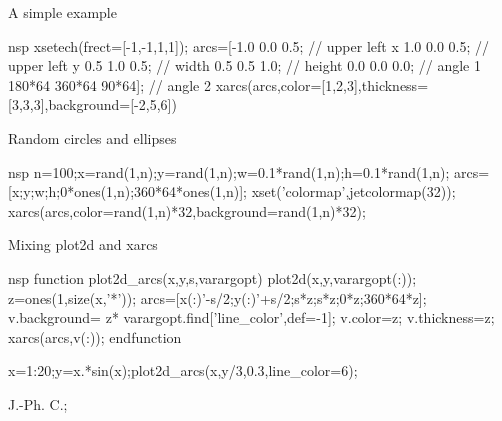 \begin{examples}

\noindent A simple example

\begin{mintednsp}{nsp}
  xsetech(frect=[-1,-1,1,1]);
  arcs=[-1.0 0.0 0.5; // upper left x
  1.0 0.0 0.5; // upper left y
  0.5 1.0 0.5; // width
  0.5 0.5 1.0; // height
  0.0 0.0 0.0; // angle 1
  180*64 360*64 90*64]; // angle 2
  xarcs(arcs,color=[1,2,3],thickness=[3,3,3],background=[-2,5,6])
\end{mintednsp}

\noindent Random circles and ellipses

\begin{mintednsp}{nsp}
  n=100;x=rand(1,n);y=rand(1,n);w=0.1*rand(1,n);h=0.1*rand(1,n);
  arcs=[x;y;w;h;0*ones(1,n);360*64*ones(1,n)];
  xset('colormap',jetcolormap(32));
  xarcs(arcs,color=rand(1,n)*32,background=rand(1,n)*32);
\end{mintednsp}

\noindent Mixing plot2d and xarcs 

\begin{mintednsp}{nsp}
function plot2d_arcs(x,y,s,varargopt)
  plot2d(x,y,varargopt(:));
  z=ones(1,size(x,'*'));
  arcs=[x(:)'-s/2;y(:)'+s/2;s*z;s*z;0*z;360*64*z];
  v.background= z* varargopt.find['line_color',def=-1];
  v.color=z;
  v.thickness=z;
  xarcs(arcs,v(:));
endfunction

  x=1:20;y=x.*sin(x);plot2d_arcs(x,y/3,0.3,line_color=6);
\end{mintednsp}

\end{examples}

\begin{manseealso}
    
\end{manseealso}


\begin{authors}
  J.-Ph. C.;
\end{authors}
